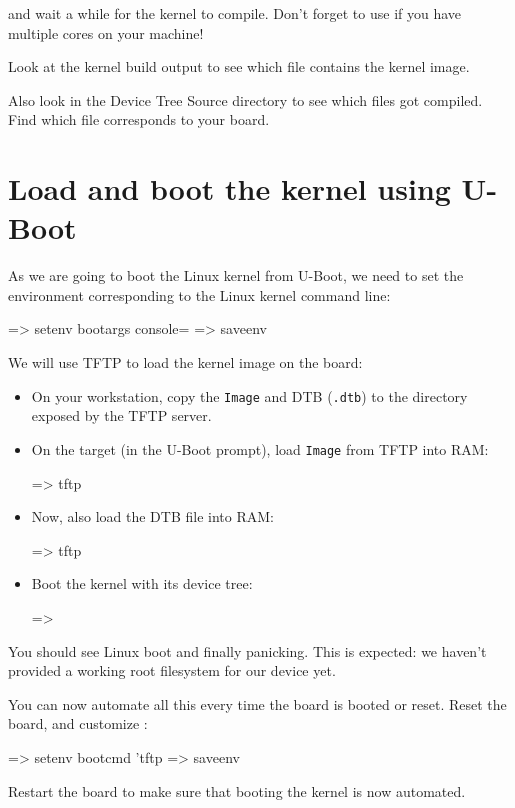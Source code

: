 
and wait a while for the kernel to compile. Don't forget to use
 if you have multiple cores on your machine!

Look at the kernel build output to see which file contains
the kernel image.

Also look in the Device Tree Source directory to see which 
files got compiled. Find which  file corresponds to your board.

\section{Load and boot the kernel using U-Boot}

As we are going to boot the Linux kernel from U-Boot,
we need to set the  environment corresponding
to the Linux kernel command line:

\begin{ubootinput}
=> setenv bootargs console=%
=> saveenv
\end{ubootinput}
We will use TFTP to load the kernel image on the board:

\begin{itemize}

\item On your workstation, copy the {\tt Image} and DTB
(\texttt{\dtname}\texttt{.dtb}) to the directory exposed by the TFTP server.

\item On the target (in the U-Boot prompt), load {\tt Image} from
TFTP into RAM:
\begin{ubootinput}
=> tftp %
\end{ubootinput}

\item Now, also load the DTB file into RAM:
\begin{ubootinput}
=> tftp %
\end{ubootinput}

\item Boot the kernel with its device tree:
\begin{ubootinput}
=> %
\end{ubootinput}

\end{itemize}

You should see Linux boot and finally panicking. This is expected: we
haven't provided a working root filesystem for our device yet.

You can now automate all this every time the board is booted or
reset. Reset the board, and customize :

\begin{ubootinput}
=> setenv bootcmd 'tftp %
=> saveenv
\end{ubootinput}

Restart the board to make sure that booting the kernel is now automated.
